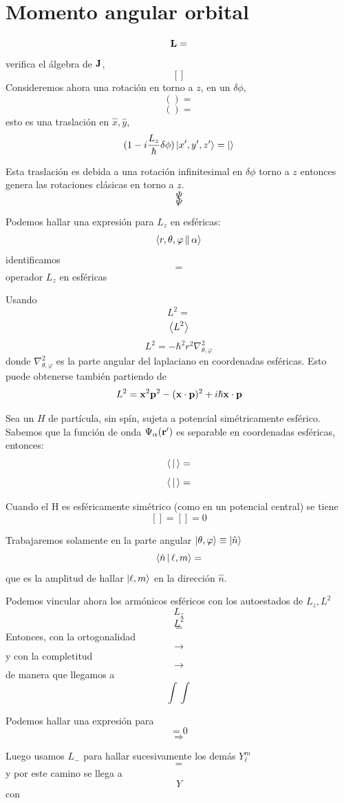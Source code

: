\documentclass[10pt,oneside]{CBFT_book}
\begin{document}
\section{Momento angular orbital}

\[
	\vb{L} =
\]
verifica el álgebra de $\vb{J}$,
\[
	[]
\]
Consideremos ahora una rotación en torno a $z$, en un $\delta\phi$,
\[
	() =
\]
\[
	() = 
\]
esto es una traslación en $\hat{x},\hat{y}$,
\[
	(1-i\frac{L_z}{\hbar}\delta\phi) \Ket{x',y',z'} = \Ket{}
\]

Esta traslación es debida a una rotación infinitesimal en $\delta\phi$ torno a $z$ entonces genera las 
rotaciones clásicas en torno a $z$.
\[
	\Psi 
\]
\[
	\Psi
\]

Podemos hallar una expresión para $L_z$ en esféricas:
\[
	\Braket{r,\theta,\varphi||\alpha}
\]
identificamos 
\[
	= 
\]
operador $L_z$ en esféricas

Usando 
\[
	L^2 = 
\]
\[
	\Braket{L^2}
\]
\[
	L^2 = -\hbar^2 r^2 \nabla^2_{\theta,\varphi}
\]
donde $\nabla^2_{\theta,\varphi}$ es la parte angular del laplaciano en coordenadas esféricas.
Esto puede obtenerse también partiendo de 
\[
	L^2 = \vb{x}^2\vb{p}^2 - (\vb{x}\cdot\vb{p})^2 + i\hbar \vb{x}\cdot\vb{p}
\]

Sea un $H$ de partícula, sin spín, sujeta a potencial simétricamente esférico. Sabemos que la función de onda 
$\Psi_\alpha(\vb{r}')$ es separable en coordenadas esféricas, entonces:
\[
	\Braket{|} = 
\]
\[
	\Braket{|} = 
\]

Cuando el H es esféricamente simétrico (como en un potencial central) se tiene 
\[
	[] = [] = 0
\]

Trabajaremos solamente en la parte angular  $\Ket{\theta,\varphi} \equiv \Ket{\hat{n}}$
\[
	\Braket{\hat{n}|\ell,m} =
\]
que es la amplitud de hallar $\Ket{\ell,m}$ en la dirección $\hat{n}$.

Podemos vincular ahora los armónicos esféricos con los autoestados de $L_z,L^2$
\[
	L_z
\]
\[
	L^2
\]
\[
	=
\]
Entonces, con la ortogonalidad
\[
	\longrightarrow
\]
y con la completitud 
\[
	\longrightarrow
\]
de manera que llegamos a 
\[
	\int \int 
\]

Podemos hallar una expresión para 
\[
	= 0
\]
\[
	\Rightarrow
\]

Luego usamos $L_-$ para hallar sucesivamente los demás $Y^m_\ell$
\[
	=
\]
y por este camino se llega a 
\[
	Y
\]
con 
\[
	\qquad 
\]
\end{document}
